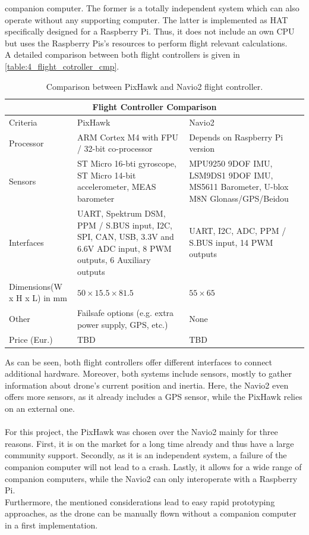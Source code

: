 companion computer.
The former is a totally independent system which can also operate without any 
supporting computer.
The latter is implemented as \ac{HAT} specifically designed for a Raspberry 
Pi.
Thus, it does not include an own \ac{CPU} but uses the Raspberry Pis's 
resources to perform flight relevant calculations.\\
A detailed comparison between both flight controllers is given in 
\autoref{table:4_flight_cotroller_cmp}.
\begin{table}[h!]
\centering
\begin{tabular}[c]{|p{4cm}||p{4cm}|p{4cm}|}
\hline
\multicolumn{3}{|c|}{Flight Controller Comparison}\\
\hline
Criteria & PixHawk & Navio2\\
\hline
\hline
Processor & ARM Cortex M4 with FPU / 32-bit co-processor & Depends on Raspberry
Pi version\\
\hline
Sensors & ST Micro 16-bti gyroscope, ST Micro 14-bit accelerometer, MEAS
barometer & MPU9250 9DOF IMU, LSM9DS1 9DOF IMU, MS5611 Barometer, U-blox M8N 
Glonass/\acs{GPS}/Beidou\\
\hline
Interfaces & UART, Spektrum DSM, PPM / S.BUS input, I2C, SPI, CAN, USB, 3.3V 
and 6.6V ADC input, 8 \acs{PWM} outputs, 6 Auxiliary outputs & UART, I2C, ADC, PPM / 
S.BUS input, 14 \acs{PWM} outputs\\
\hline
Dimensions\newline(W x H x L) in mm & $50 \times 15.5 \times 81.5$ & $55 \times 65$\\ 
\hline
Other & Failsafe options (e.g. extra power supply, \acs{GPS}, etc.) & None\\
\hline
Price (Eur.) & TBD & TBD\\
\hline
\end{tabular}
\caption[Flight controller comparison]{Comparison between PixHawk and 
Navio2 flight controller.}
\label{table:4_flight_cotroller_cmp}
\end{table}

\noindent As can be seen, both flight controllers offer different interfaces 
to connect additional hardware.
Moreover, both systems include sensors, mostly to gather information about 
drone's current position and inertia.
Here, the Navio2 even offers more sensors, as it already includes a \ac{GPS} 
sensor, while the PixHawk relies on an external one.\\\\
\noindent For this project, the PixHawk was chosen over the Navio2 mainly for 
three reasons.
First, it is on the market for a long time already and thus have a large 
community support.
Secondly, as it is an independent system, a failure of the companion computer 
will not lead to a crash.
Lastly, it allows for a wide range of companion computers, while the Navio2 
can only interoperate with a Raspberry Pi.\\
Furthermore, the mentioned considerations lead to easy rapid prototyping 
approaches, as the drone can be manually flown without a companion computer in
a first implementation.

